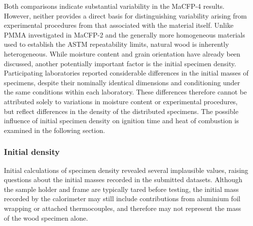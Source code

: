 \documentclass{book}
\begin{document}
Both comparisons indicate substantial variability in the MaCFP-4 results. However, neither provides a direct basis for distinguishing variability arising from experimental procedures from that associated with the material itself. Unlike PMMA investigated in MaCFP-2 and the generally more homogeneous materials used to establish the ASTM repeatability limits, natural wood is inherently heterogeneous.
While moisture content and grain orientation have already been discussed, another potentially important factor is the initial specimen density. Participating laboratories reported considerable differences in the initial masses of specimens, despite their nominally identical dimensions and conditioning under the same conditions within each laboratory. These differences therefore cannot be attributed solely to variations in moisture content or experimental procedures, but reflect differences in the density of the distributed specimens. The possible influence of initial specimen density on ignition time and heat of combustion is examined in the following section.

\begin{landscape}
\begin{table}[htpb]
  \centering
  \caption{Comparison of experimental repeatability limits for calculated ignition time, reported ignition time and heat of combustion with those specified in ASTM E1354-23.}
  \label{tab:astm_repeatability}
  \footnotesize
  \setlength{\tabcolsep}{5pt}
  
\end{table}
\end{landscape}

\begin{table}[htbp]
  \centering
  \caption{Summary of experimental series satisfying the repeatability limits specified in ASTM E1354-23 for calculated ignition time, reported ignition time and heat of combustion.}
  \label{tab:astm_repeatability_summary}
  \small
  
\end{table}



\FloatBarrier
\subsubsection{Initial density}

Initial calculations of specimen density revealed several implausible values, raising questions about the initial masses recorded in the submitted datasets. Although the sample holder and frame are typically tared before testing, the initial mass recorded by the calorimeter may still include contributions from aluminium foil wrapping or attached thermocouples, and therefore may not represent the mass of the wood specimen alone.
\end{document}
